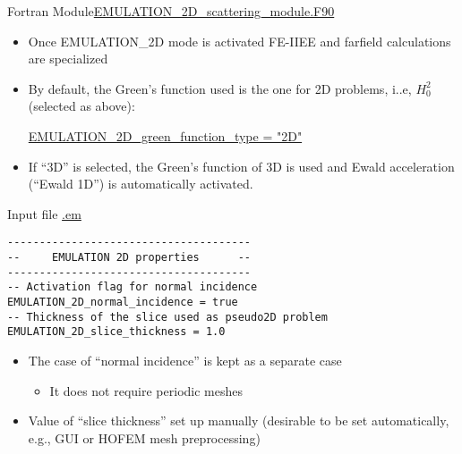 \begin{frame}{Fortran Module}{\url{EMULATION_2D_scattering_module.F90}}
   \begin{itemize}
   \item Once EMULATION\_2D mode is activated FE-IIEE and farfield
     calculations are specialized
   \item By default, the Green's function used is the one for 2D
     problems, i..e, $H_0^2$ (selected as above):
     \begin{center}
     \url{EMULATION_2D_green_function_type = "2D"}
   \end{center}

 \item If ``3D'' is selected, the Green's function of 3D is used and
   Ewald acceleration (``Ewald 1D'') is automatically activated.
   \end{itemize}
   
   \framebreak %

   
   \begin{block}{Input file \url{.em}} 
     \begin{lstlisting}[basicstyle=\ttfamily\footnotesize,tabsize=3,frame=none]
--------------------------------------
--     EMULATION 2D properties      --
--------------------------------------
-- Activation flag for normal incidence
EMULATION_2D_normal_incidence = true
-- Thickness of the slice used as pseudo2D problem
EMULATION_2D_slice_thickness = 1.0
     \end{lstlisting}
   \end{block}

   \begin{itemize}
   \item The case of ``normal incidence'' is kept as a separate case
     \begin{itemize}
     \item It does not require periodic meshes
     \end{itemize}
   \item Value of ``slice thickness'' set up manually (desirable to be
     set automatically, e.g., GUI or HOFEM mesh preprocessing)
   \end{itemize}
   
  \end{frame}
  
  
